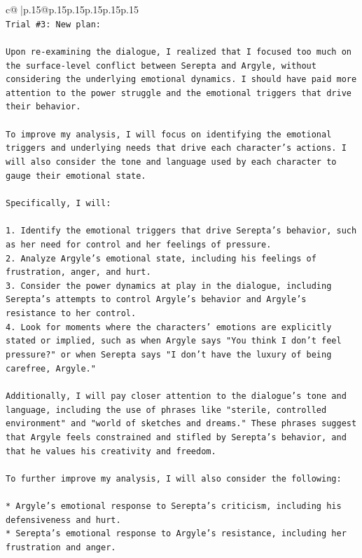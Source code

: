 \documentclass{article}
\begin{document}
{\begin{supertabular}{c@{$\;$}|p{.15\linewidth}@{}p{.15\linewidth}p{.15\linewidth}p{.15\linewidth}p{.15\linewidth}p{.15\linewidth}}
{{{\\ 
\texttt{Trial \#3: New plan: } \\
\\ 
\texttt{Upon re{-}examining the dialogue, I realized that I focused too much on the surface{-}level conflict between Serepta and Argyle, without considering the underlying emotional dynamics. I should have paid more attention to the power struggle and the emotional triggers that drive their behavior.} \\
\\ 
\texttt{To improve my analysis, I will focus on identifying the emotional triggers and underlying needs that drive each character's actions. I will also consider the tone and language used by each character to gauge their emotional state.} \\
\\ 
\texttt{Specifically, I will:} \\
\\ 
\texttt{1. Identify the emotional triggers that drive Serepta's behavior, such as her need for control and her feelings of pressure.} \\
\texttt{2. Analyze Argyle's emotional state, including his feelings of frustration, anger, and hurt.} \\
\texttt{3. Consider the power dynamics at play in the dialogue, including Serepta's attempts to control Argyle's behavior and Argyle's resistance to her control.} \\
\texttt{4. Look for moments where the characters' emotions are explicitly stated or implied, such as when Argyle says "You think I don't feel pressure?" or when Serepta says "I don't have the luxury of being carefree, Argyle."} \\
\\ 
\texttt{Additionally, I will pay closer attention to the dialogue's tone and language, including the use of phrases like "sterile, controlled environment" and "world of sketches and dreams." These phrases suggest that Argyle feels constrained and stifled by Serepta's behavior, and that he values his creativity and freedom.} \\
\\ 
\texttt{To further improve my analysis, I will also consider the following:} \\
\\ 
\texttt{* Argyle's emotional response to Serepta's criticism, including his defensiveness and hurt.} \\
\texttt{* Serepta's emotional response to Argyle's resistance, including her frustration and anger.} \\
}}}
\end{supertabular}}
\end{document}
